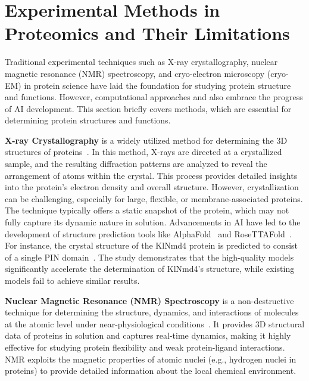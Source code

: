 \section{Experimental Methods in Proteomics and Their Limitations}
\label{sec:experiment}

Traditional experimental techniques such as X-ray crystallography, nuclear magnetic resonance (NMR) spectroscopy, and cryo-electron microscopy (cryo-EM) in protein science have laid the foundation for studying protein structure and functions. However, computational approaches and also embrace the progress of AI development. This section briefly covers methods, which are essential for determining protein structures and functions.

\smallskip \noindent \textbf{X-ray Crystallography} is a widely utilized method for determining the 3D structures of proteins~\citep{jones1986using}. 
In this method, X-rays are directed at a crystallized sample, and the resulting diffraction patterns are analyzed to reveal the arrangement of atoms within the crystal. 
This process provides detailed insights into the protein's electron density and overall structure. 
However, crystallization can be challenging, especially for large, flexible, or membrane-associated proteins. The technique typically offers a static snapshot of the protein, which may not fully capture its dynamic nature in solution.
Advancements in AI have led to the development of structure prediction tools like AlphaFold~\citep{jumper2021highly} and RoseTTAFold~\citep{baek2021accurate}. For instance, the crystal structure of the KlNmd4 protein is predicted to consist of a single PIN domain~\citep{barbarin2021artificial}. The study demonstrates that the high-quality models significantly accelerate the determination of KlNmd4's structure, while existing models fail to achieve similar results. 


\smallskip \noindent \textbf{Nuclear Magnetic Resonance (NMR) Spectroscopy} is a non-destructive technique for determining the structure, dynamics, and interactions of molecules at the atomic level under near-physiological conditions~\citep{shukla2023biomolecular}. 
It provides 3D structural data of proteins in solution and captures real-time dynamics, making it highly effective for studying protein flexibility and weak protein-ligand interactions. NMR exploits the magnetic properties of atomic nuclei (e.g., hydrogen nuclei in proteins) to provide detailed information about the local chemical environment. 


